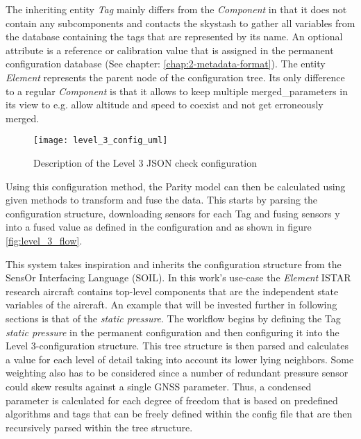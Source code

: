 The inheriting entity \textit{Tag} mainly differs from the \textit{Component} in that it does not contain any subcomponents and contacts the skystash to gather all variables from the database containing the tags that are represented by its name. An optional attribute is a reference or calibration value that is assigned in the permanent configuration database (See chapter: \ref{chap:2-metadata-format}).
The entity \textit{Element} represents the parent node of the configuration tree. Its only difference to a regular \textit{Component} is that it allows to keep multiple merged_parameters in its view to e.g. allow altitude and speed to coexist and not get erroneously merged.

\begin{figure}
    \centering
    \texttt{[image: level\_3\_config\_uml]}
    \caption{Description of the Level 3 JSON check configuration}
    \label{fig:level_3_config_uml}
\end{figure}

Using this configuration method, the Parity model can then be calculated using given methods to transform and fuse the data. This starts by parsing the configuration structure, downloading sensors for each Tag and fusing sensors y into a fused value as defined in the configuration and as shown in figure \ref{fig:level_3_flow}.



This system takes inspiration and inherits the configuration structure from the SensOr Interfacing Language (SOIL)\cite{behrens_domain-specific_2021}. In this work's use-case the \textit{Element} ISTAR research aircraft contains top-level components that are the independent state variables of the aircraft. An example that will be invested further in following sections is that of the \textit{static pressure}. The workflow begins by defining the Tag \textit{static pressure} in the permanent configuration and then configuring it into the Level 3-configuration structure. This tree structure is then parsed and calculates a value for each level of detail taking into account its lower lying neighbors. Some weighting also has to be considered since a number of redundant pressure sensor could skew results against a single GNSS parameter. Thus, a condensed parameter is calculated for each degree of freedom that is based on predefined algorithms and tags that can be freely defined within the config file that are then recursively parsed within the tree structure.

